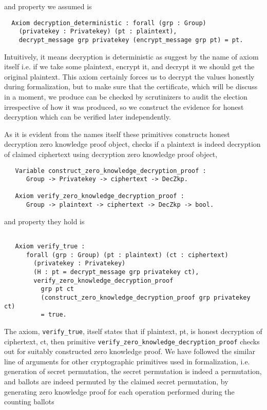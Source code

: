 \documentclass{llncs}
\begin{document}
 and property we assumed is 
 
 \begin{verbatim}
  Axiom decryption_deterministic : forall (grp : Group) 
    (privatekey : Privatekey) (pt : plaintext), 
    decrypt_message grp privatekey (encrypt_message grp pt) = pt.
 \end{verbatim}
 
 Intuitively, it means decryption is deterministic as suggest by the name of 
 axiom itself i.e. if we take some plaintext, encrypt it, and decrypt it we should get 
 the original plaintext. This axiom certainly forces us to decrypt the values 
 honestly during formalization, but to make sure that the certificate, which 
 will be discuss in a moment, we produce can be checked 
 by scrutinizers to audit the election irrespective of how it was 
 produced, so we construct the evidence for honest decryption which
 can be verified later independently.
 
 As it is evident from the names itself these primitives constructs honest
 decryption zero knowledge proof object, checks if a plaintext is indeed 
 decryption of claimed ciphertext using decryption zero knowledge proof object, 
 
 \begin{verbatim}
   Variable construct_zero_knowledge_decryption_proof :
      Group -> Privatekey -> ciphertext -> DecZkp.

   Axiom verify_zero_knowledge_decryption_proof :
      Group -> plaintext -> ciphertext -> DecZkp -> bool.  
 \end{verbatim}
 and property they hold is
 \begin{verbatim}
   
   Axiom verify_true :
      forall (grp : Group) (pt : plaintext) (ct : ciphertext) 
        (privatekey : Privatekey)
        (H : pt = decrypt_message grp privatekey ct),
        verify_zero_knowledge_decryption_proof
          grp pt ct
          (construct_zero_knowledge_decryption_proof grp privatekey ct) 
          = true.
 \end{verbatim}
 
 The axiom, \texttt{verify\_true}, itself states that if plaintext, pt, is honest
 decryption of ciphertext, ct, then primitive
 \texttt{verify\_zero\_knowledge\_decryption\_proof} checks out for 
 suitably constructed zero knowledge proof. We have followed the similar line of 
 arguments for other cryptographic primitives used in formalization, i.e. generation
  of secret permutation, 
 the secret permutation is indeed a permutation, and ballots are indeed permuted by the
 claimed secret permutation, by generating zero knowledge proof 
 for each operation performed during the counting ballots
 
\end{document}
